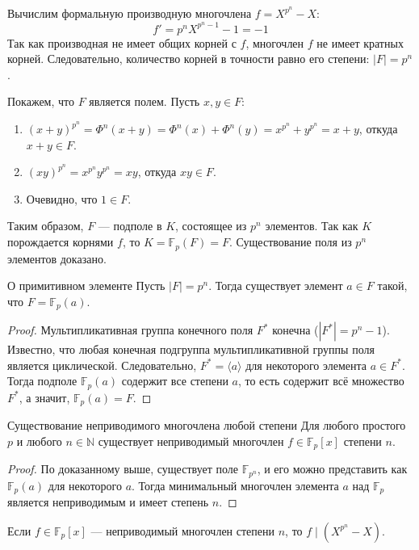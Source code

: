 Вычислим формальную производную многочлена $f = X^{p^n} - X$:
\[ f' = p^n X^{p^n - 1} - 1 = -1 \]
Так как производная не имеет общих корней с $f$, многочлен $f$ не имеет кратных корней. Следовательно, количество корней в точности равно его степени: $|F| = p^n$.

Покажем, что $F$ является полем. Пусть $x, y \in F$:
\begin{enumerate}
	\item $(x+y)^{p^n} = \Phi^n(x+y) = \Phi^n(x) + \Phi^n(y) = x^{p^n} + y^{p^n} = x + y$, откуда $x+y \in F$.
	\item $(xy)^{p^n} = x^{p^n}y^{p^n} = xy$, откуда $xy \in F$.
	\item Очевидно, что $1 \in F$.
\end{enumerate}
Таким образом, $F$ --- подполе в $K$, состоящее из $p^n$ элементов. Так как $K$ порождается корнями $f$, то $K = \mathbb{F}_p(F) = F$. Существование поля из $p^n$ элементов доказано.

\begin{Proposition}{О примитивном элементе}{}
	Пусть $|F| = p^n$. Тогда существует элемент $a \in F$ такой, что $F = \mathbb{F}_p(a)$.
\end{Proposition}

\begin{proof}
	Мультипликативная группа конечного поля $F^*$ конечна ($|F^*| = p^n - 1$). Известно, что любая конечная подгруппа мультипликативной группы поля является циклической. 
	Следовательно, $F^* = \langle a \rangle$ для некоторого элемента $a \in F^*$. 
	Тогда подполе $\mathbb{F}_p(a)$ содержит все степени $a$, то есть содержит всё множество $F^*$, а значит, $\mathbb{F}_p(a) = F$.
\end{proof}

\begin{Corollary}{Существование неприводимого многочлена любой степени}{}
	Для любого простого $p$ и любого $n \in \mathbb{N}$ существует неприводимый многочлен $f \in \mathbb{F}_p[x]$ степени $n$.
\end{Corollary}

\begin{proof}
	По доказанному выше, существует поле $\mathbb{F}_{p^n}$, и его можно представить как $\mathbb{F}_p(a)$ для некоторого $a$. Тогда минимальный многочлен элемента $a$ над $\mathbb{F}_p$ является неприводимым и имеет степень $n$.
\end{proof}

\begin{Remark}{}{}
	Если $f \in \mathbb{F}_p[x]$ --- неприводимый многочлен степени $n$, то $f \mid (X^{p^n} - X)$.
\end{Remark}

